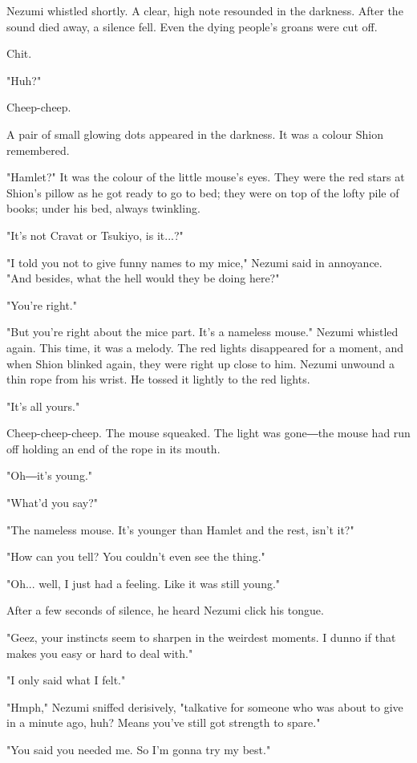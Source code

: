 Nezumi whistled shortly. A clear, high note resounded in the darkness.
After the sound died away, a silence fell. Even the dying people's
groans were cut off.

Chit.

"Huh?"

Cheep-cheep.

A pair of small glowing dots appeared in the darkness. It was a colour
Shion remembered.

"Hamlet?" It was the colour of the little mouse's eyes. They were the
red stars at Shion's pillow as he got ready to go to bed; they were on
top of the lofty pile of books; under his bed, always twinkling.

"It's not Cravat or Tsukiyo, is it...?"

"I told you not to give funny names to my mice," Nezumi said in
annoyance. "And besides, what the hell would they be doing here?"

"You're right."

"But you're right about the mice part. It's a nameless mouse." Nezumi
whistled again. This time, it was a melody. The red lights disappeared
for a moment, and when Shion blinked again, they were right up close to
him. Nezumi unwound a thin rope from his wrist. He tossed it lightly to
the red lights.

"It's all yours."

Cheep-cheep-cheep. The mouse squeaked. The light was gone―the mouse had
run off holding an end of the rope in its mouth.

"Oh―it's young."

"What'd you say?"

"The nameless mouse. It's younger than Hamlet and the rest, isn't it?"

"How can you tell? You couldn't even see the thing."

"Oh... well, I just had a feeling. Like it was still young."

After a few seconds of silence, he heard Nezumi click his tongue.

"Geez, your instincts seem to sharpen in the weirdest moments. I dunno
if that makes you easy or hard to deal with."

"I only said what I felt."

"Hmph," Nezumi sniffed derisively, "talkative for someone who was about
to give in a minute ago, huh? Means you've still got strength to spare."

"You said you needed me. So I'm gonna try my best."

